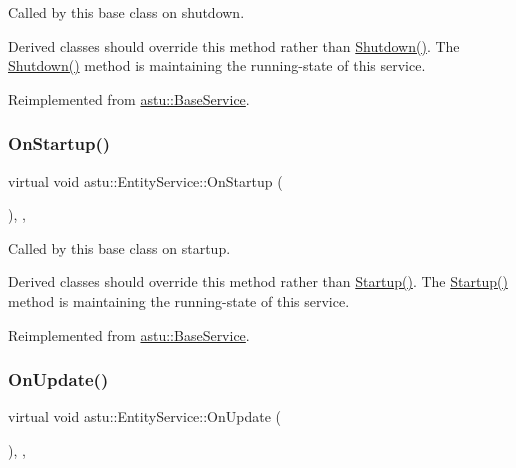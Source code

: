 Called by this base class on shutdown.

Derived classes should override this method rather than {\ttfamily \hyperlink{classastu_1_1UpdatableBaseService_a7ad7e0201007878b6014361dd5ba82f9}{Shutdown()}}. The {\ttfamily \hyperlink{classastu_1_1UpdatableBaseService_a7ad7e0201007878b6014361dd5ba82f9}{Shutdown()}} method is maintaining the running-\/state of this service. 

Reimplemented from \hyperlink{classastu_1_1BaseService_aeb5003f7c5efe5412725ac4c66942d03}{astu\+::\+Base\+Service}.

\mbox{\label{classastu_1_1EntityService_a293ff7c8b84837b08cdabe98ed8a23ea}} 
\subsubsection{\texorpdfstring{On\+Startup()}{OnStartup()}}
{\footnotesize\ttfamily virtual void astu\+::\+Entity\+Service\+::\+On\+Startup (\begin{DoxyParamCaption}{ }\end{DoxyParamCaption})\hspace{0.3cm}{\ttfamily [override]}, {\ttfamily [protected]}, {\ttfamily [virtual]}}

Called by this base class on startup.

Derived classes should override this method rather than {\ttfamily \hyperlink{classastu_1_1UpdatableBaseService_a47e3725f717cee3cd8983f485b2a0243}{Startup()}}. The {\ttfamily \hyperlink{classastu_1_1UpdatableBaseService_a47e3725f717cee3cd8983f485b2a0243}{Startup()}} method is maintaining the running-\/state of this service. 

Reimplemented from \hyperlink{classastu_1_1BaseService_ac8710cd2d6dcc990db65e7c8ccfbc5ff}{astu\+::\+Base\+Service}.

\mbox{\label{classastu_1_1EntityService_a70831a8dc185652c2c9056c4e3cc10e0}} 
\subsubsection{\texorpdfstring{On\+Update()}{OnUpdate()}}
{\footnotesize\ttfamily virtual void astu\+::\+Entity\+Service\+::\+On\+Update (\begin{DoxyParamCaption}{ }\end{DoxyParamCaption})\hspace{0.3cm}{\ttfamily [override]}, {\ttfamily [protected]}, {\ttfamily [virtual]}}

